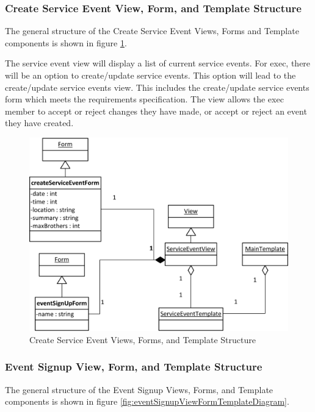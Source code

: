 \documentclass{article}
\begin{document}
\subsubsection{Create Service Event View, Form, and Template Structure}

The general structure of the Create Service Event Views, Forms and Template components is shown in figure \ref{fig:createServiceEventViewFormTemplateDiagram}.

The service event view will display a list of current service events.
For exec, there will be an option to create/update service events. This option will lead to the create/update service events view. This includes the create/update service events form which meets the requirements specification. The view allows the exec member to accept or reject changes they have made, or accept or reject an event they have created.

\FloatBarrier
\begin{figure}[h!]
\centering
\includegraphics[scale=.65]{img/viewFormTemplateDiagrams/createServiceEvent}
\caption{Create Service Event Views, Forms, and Template Structure}
\label{fig:createServiceEventViewFormTemplateDiagram}
\end{figure}
\FloatBarrier

\subsubsection{Event Signup View, Form, and Template Structure}

The general structure of the Event Signup Views, Forms, and Template components is shown in figure \ref{fig:eventSignupViewFormTemplateDiagram}.
\end{document}
